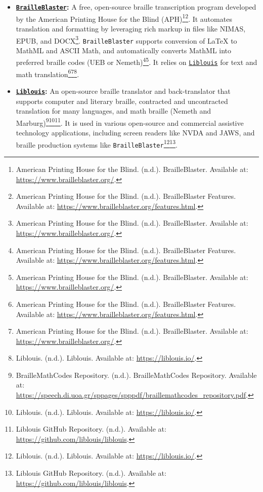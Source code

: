 \begin{itemize}
    \item \textbf{\href{https://github.com/aphtech/brailleblaster}{\texttt{BrailleBlaster}}:} A free, open-source braille transcription program developed by the American Printing House for the Blind (APH)\footnote{American Printing House for the Blind. (n.d.). BrailleBlaster. Available at: \url{https://www.brailleblaster.org/}.}\footnote{American Printing House for the Blind. (n.d.). BrailleBlaster Features. Available at: \url{https://www.brailleblaster.org/features.html}.}. It automates translation and formatting by leveraging rich markup in files like NIMAS, EPUB, and DOCX\footnote{American Printing House for the Blind. (n.d.). BrailleBlaster. Available at: \url{https://www.brailleblaster.org/}.}. \texttt{BrailleBlaster} supports conversion of LaTeX to MathML and ASCII Math, and automatically converts MathML into preferred braille codes (UEB or Nemeth)\footnote{American Printing House for the Blind. (n.d.). BrailleBlaster Features. Available at: \url{https://www.brailleblaster.org/features.html}.}\footnote{American Printing House for the Blind. (n.d.). BrailleBlaster. Available at: \url{https://www.brailleblaster.org/}.}. It relies on \href{https://liblouis.io/}{\texttt{Liblouis}} for text and math translation\footnote{American Printing House for the Blind. (n.d.). BrailleBlaster Features. Available at: \url{https://www.brailleblaster.org/features.html}.}\footnote{American Printing House for the Blind. (n.d.). BrailleBlaster. Available at: \url{https://www.brailleblaster.org/}.}\footnote{Liblouis. (n.d.). Liblouis. Available at: \url{https://liblouis.io/}.}.
    \item \textbf{\href{https://liblouis.io/}{\texttt{Liblouis}}:} An open-source braille translator and back-translator that supports computer and literary braille, contracted and uncontracted translation for many languages, and math braille (Nemeth and Marburg)\footnote{BrailleMathCodes Repository. (n.d.). BrailleMathCodes Repository. Available at: \url{https://speech.di.uoa.gr/sppages/spppdf/braillemathcodes_repository.pdf}.}\footnote{Liblouis. (n.d.). Liblouis. Available at: \url{https://liblouis.io/}.}\footnote{Liblouis GitHub Repository. (n.d.). Available at: \url{https://github.com/liblouis/liblouis}.}. It is used in various open-source and commercial assistive technology applications, including screen readers like NVDA and JAWS, and braille production systems like \texttt{BrailleBlaster}\footnote{Liblouis. (n.d.). Liblouis. Available at: \url{https://liblouis.io/}.}\footnote{Liblouis GitHub Repository. (n.d.). Available at: \url{https://github.com/liblouis/liblouis}.}.
\end{itemize}
